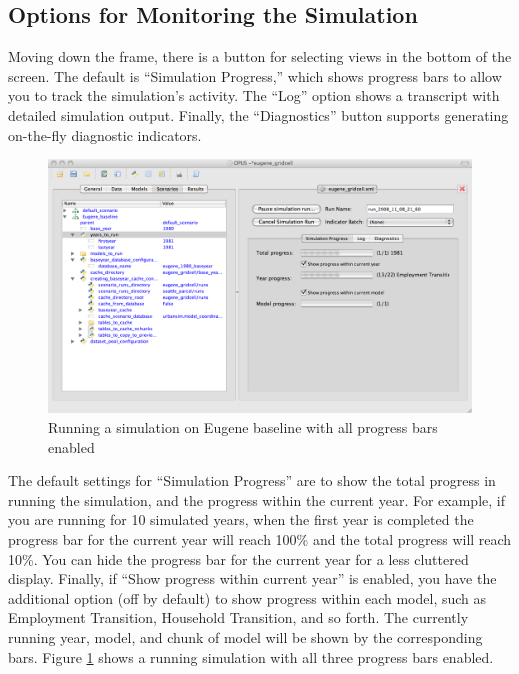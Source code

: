 \subsection{Options for Monitoring the Simulation}
\label{sec:monitoring-simulation}

Moving down the frame, there is a button for selecting views in the bottom
of the screen.  The default is ``Simulation Progress,'' which shows
progress bars to allow you to track the simulation's activity.  The ``Log''
option shows a transcript with detailed simulation output.  Finally, the
``Diagnostics'' button supports generating on-the-fly diagnostic
indicators.  

\begin{figure}[htp]
\begin{center}
\includegraphics[scale=0.4]{part-gui/images/scenario-manager-progress-bars.png}
\end{center}
\caption{Running a simulation on Eugene baseline with all progress bars
  enabled}
\label{fig:scenario-manager-progress-bars}
\end{figure}

The default settings for ``Simulation Progress'' are to show the total
progress in running the simulation, and the progress within the current
year.  For example, if you are running for 10 simulated years, when the
first year is completed the progress bar for the current year will reach
100\% and the total progress will reach 10\%.  You can hide the progress
bar for the current year for a less cluttered display.  Finally, if ``Show
progress within current year'' is enabled, you have the additional option
(off by default) to show progress within each model, such as Employment
Transition, Household Transition, and so forth. The currently running year,
model, and chunk of model will be shown by the corresponding bars.  Figure
\ref{fig:scenario-manager-progress-bars} shows a running simulation with all
three progress bars enabled.

